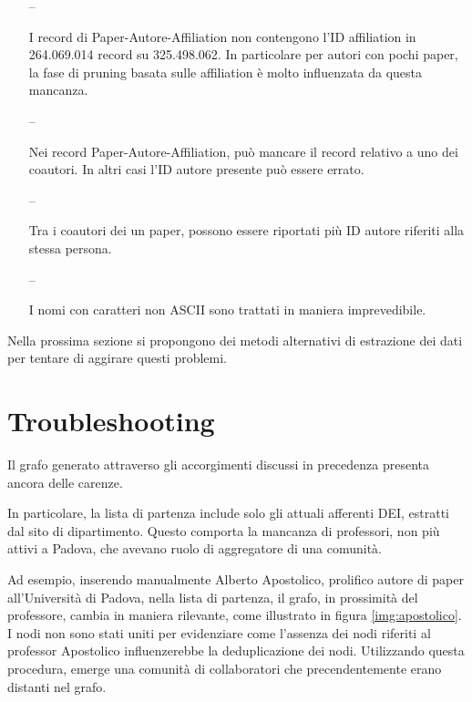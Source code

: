 \documentclass[12pt,a4paper,twoside]{report}
\begin{document}
\begin{itemize}
\item[--]

I record di Paper-Autore-Affiliation non contengono l'ID affiliation in 264.069.014 record su
325.498.062. In particolare per autori con pochi paper, la fase di pruning basata sulle
affiliation è molto influenzata da questa mancanza.

\item[--]

Nei record Paper-Autore-Affiliation, può mancare il record relativo a uno dei coautori. In altri
        casi l'ID autore presente può essere errato.

\item[--]

Tra i coautori dei un paper, possono essere riportati più ID autore riferiti alla stessa persona.

\item[--]

I nomi con caratteri non ASCII sono trattati in maniera imprevedibile.

\end{itemize}


Nella prossima sezione si propongono dei metodi alternativi di estrazione dei dati per tentare di
aggirare questi problemi.

\section{Troubleshooting}
Il grafo generato attraverso gli accorgimenti discussi in precedenza presenta ancora delle carenze.


In particolare, la lista di partenza include solo gli attuali afferenti DEI, estratti dal sito di
dipartimento. Questo comporta la mancanza di professori, non più attivi a Padova, che avevano ruolo
di aggregatore di una comunità.

Ad esempio, inserendo manualmente Alberto Apostolico, prolifico autore di paper all'Università di
Padova, nella lista di partenza, il grafo, in prossimità del professore, cambia in maniera
rilevante, come illustrato in figura \ref{img:apostolico}. I nodi non sono stati uniti per
evidenziare come l'assenza dei nodi riferiti al professor Apostolico influenzerebbe la
deduplicazione dei nodi. Utilizzando questa procedura, emerge una comunità di collaboratori che
precendentemente erano distanti nel grafo.
\end{document}
